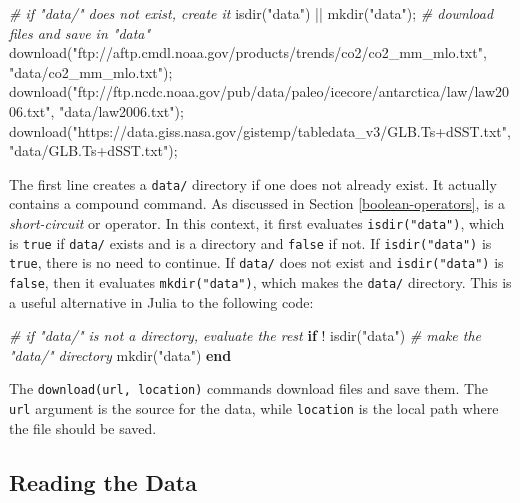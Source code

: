 \documentclass[
  11pt,
]{book}
\newenvironment{Shaded}{\begin{snugshade}}{\end{snugshade}}
\newcommand{\CommentTok}[1]{\textcolor[rgb]{0.37,0.37,0.37}{\textit{#1}}}
\newcommand{\KeywordTok}[1]{\textcolor[rgb]{0.27,0.27,0.27}{\textbf{#1}}}
\newcommand{\NormalTok}[1]{#1}
\newcommand{\StringTok}[1]{\textcolor[rgb]{0.5,0.5,0.5}{#1}}
\begin{document}
\begin{Shaded}
\begin{Highlighting}[]
\CommentTok{# if "data/" does not exist, create it}
\NormalTok{isdir(}\StringTok{"data"}\NormalTok{) || mkdir(}\StringTok{"data"}\NormalTok{); }
\CommentTok{# download files and save in "data"}
\NormalTok{download(}\StringTok{"ftp://aftp.cmdl.noaa.gov/products/trends/co2/co2_mm_mlo.txt"}\NormalTok{, }
    \StringTok{"data/co2_mm_mlo.txt"}\NormalTok{);}
\NormalTok{download(}\StringTok{"ftp://ftp.ncdc.noaa.gov/pub/data/paleo/icecore/antarctica/law/law2006.txt"}\NormalTok{, }
    \StringTok{"data/law2006.txt"}\NormalTok{);}
\NormalTok{download(}\StringTok{"https://data.giss.nasa.gov/gistemp/tabledata_v3/GLB.Ts+dSST.txt"}\NormalTok{, }
    \StringTok{"data/GLB.Ts+dSST.txt"}\NormalTok{);}
\end{Highlighting}
\end{Shaded}

The first line creates a \texttt{data/} directory if one does not already exist. It actually contains a compound command. As discussed in Section \ref{boolean-operators}, \texttt{\textbar{}\textbar{}} is a \emph{short-circuit} or operator. In this context, it first evaluates \texttt{isdir("data")}, which is \texttt{true} if \texttt{data/} exists and is a directory and \texttt{false} if not. If \texttt{isdir("data")} is \texttt{true}, there is no need to continue. If \texttt{data/} does not exist and \texttt{isdir("data")} is \texttt{false}, then it evaluates \texttt{mkdir("data")}, which makes the \texttt{data/} directory. This is a useful alternative in Julia to the following code:

\begin{Shaded}
\begin{Highlighting}[]
\CommentTok{# if "data/" is not a directory, evaluate the rest}
\KeywordTok{if}\NormalTok{ ! isdir(}\StringTok{"data"}\NormalTok{) }
    \CommentTok{# make the "data/" directory}
\NormalTok{    mkdir(}\StringTok{"data"}\NormalTok{) }
\KeywordTok{end}
\end{Highlighting}
\end{Shaded}

The \texttt{download(url,\ location)} commands download files and save them. The \texttt{url} argument is the source for the data, while \texttt{location} is the local path where the file should be saved.

\hypertarget{reading-the-data}{%
\subsection{Reading the Data}\label{reading-the-data}}
\end{document}
